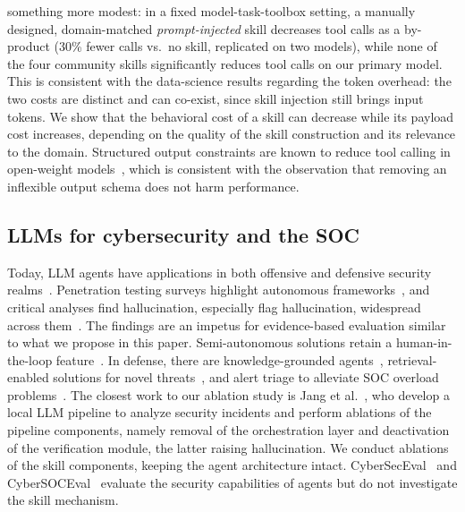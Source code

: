 \documentclass[conference]{IEEEtran}
\newcommand{\num}[1]{#1} %
\begin{document}
something more modest: in a fixed model-task-toolbox setting, a manually designed,
domain-matched \emph{prompt-injected} skill decreases tool calls as a by-product (\num{30}\%
fewer calls vs.\ no skill, replicated on two models), while none of the four community
skills significantly reduces tool calls on our primary model. This is consistent with the
data-science results regarding the token overhead: the two costs are distinct and can
co-exist, since skill injection still brings input tokens. We show that the behavioral cost
of a skill can decrease while its payload cost increases, depending on the quality of the
skill construction and its relevance to the domain. Structured output constraints are known
to reduce tool calling in open-weight models~\cite{constrainttax2026}, which is consistent
with the observation that removing an inflexible output schema does not harm performance.

\subsection{LLMs for cybersecurity and the SOC}
Today, LLM agents have applications in both offensive and defensive security
realms~\cite{agenticsecurity2025,securityduality2026}. Penetration testing surveys highlight
autonomous frameworks~\cite{pentestsurvey2026}, and critical analyses find hallucination,
especially flag hallucination, widespread across them~\cite{hackorhalluc2026}. The findings
are an impetus for evidence-based evaluation similar to what we propose in this paper.
Semi-autonomous solutions retain a human-in-the-loop feature~\cite{semiautopentest2025}. In
defense, there are knowledge-grounded agents~\cite{craken2025}, retrieval-enabled solutions
for novel threats~\cite{ragcyber2025}, and alert triage to alleviate SOC overload
problems~\cite{alertfatigue2026}. The closest work to our ablation study is Jang et
al.~\cite{airgappedir2026}, who develop a local LLM pipeline to analyze security incidents
and perform ablations of the pipeline components, namely removal of the orchestration layer
and deactivation of the verification module, the latter raising hallucination. We conduct
ablations of the skill components, keeping the agent architecture intact.
CyberSecEval~\cite{cyberseceval2024} and CyberSOCEval~\cite{cybersoceval2025} evaluate the
security capabilities of agents but do not investigate the skill mechanism.
\end{document}

